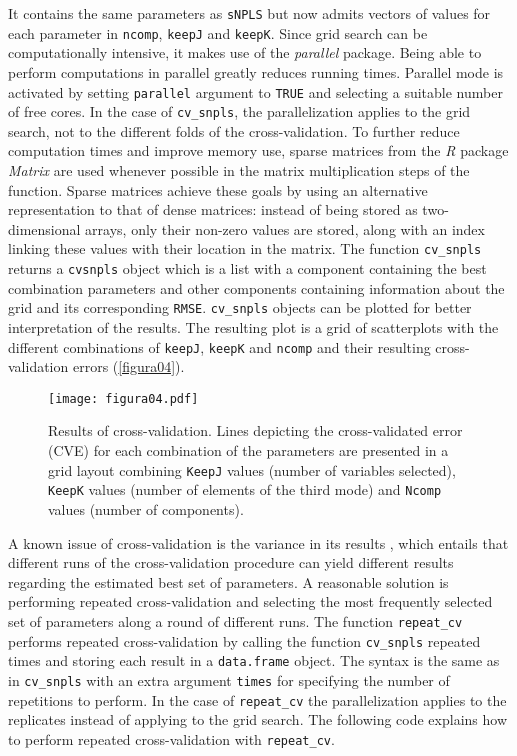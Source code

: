 It contains the same parameters as \texttt{sNPLS} but now admits vectors of values for each parameter in \texttt{ncomp}, \texttt{keepJ} and \texttt{keepK}. Since grid search can be computationally intensive, it makes use of the \textit{parallel} package. Being able to perform computations in parallel greatly reduces running times. Parallel mode is activated by setting \texttt{parallel} argument to \texttt{TRUE} and selecting a suitable number of free cores. In the case of \texttt{cv\_snpls}, the parallelization applies to the grid search, not to the different folds of the cross-validation. To further reduce computation times and improve memory use, sparse matrices from the \textit{R} package \textit{Matrix} \parencite{matrixsparse} are used whenever possible in the matrix multiplication steps of the function. Sparse matrices achieve these goals by using an alternative representation to that of dense matrices: instead of being stored as two-dimensional arrays, only their non-zero values are stored, along with an index linking these values with their location in the matrix. The function \texttt{cv\_snpls} returns a \texttt{cvsnpls} object which is a list with a component containing the best combination parameters and other components containing information about the grid and its corresponding \texttt{RMSE}. \texttt{cv\_snpls} objects  can be plotted for better interpretation of the results. The resulting plot is a grid of scatterplots with the different combinations of \texttt{keepJ}, \texttt{keepK} and \texttt{ncomp} and their resulting cross-validation errors (\autoref{figura04}).

\begin{figure}[!ht]
	\centering
\texttt{[image: figura04.pdf]}
\caption{Results of cross-validation. Lines depicting the cross-validated error (CVE) for each combination of the parameters are presented in a grid layout combining \texttt{KeepJ} values (number of variables selected), \texttt{KeepK} values (number of elements of the third mode) and \texttt{Ncomp} values (number of components).}
\label{figura04}
\end{figure}

A known issue of cross-validation is the variance in its results \parencite{krstajic2014cross}, which entails that different runs of the cross-validation procedure can yield different results regarding the estimated best set of parameters. A reasonable solution is performing repeated cross-validation and selecting the most frequently selected set of parameters along a round of different runs. The function \texttt{repeat\_cv} performs repeated cross-validation by calling the function \texttt{cv\_snpls} repeated times and storing each result in a \texttt{data.frame} object. The syntax is the same as in \texttt{cv\_snpls} with an extra argument \texttt{times} for specifying the number of repetitions to perform. In the case of \texttt{repeat\_cv} the parallelization applies to the replicates instead of applying to the grid search. The following code explains how to perform repeated cross-validation with \texttt{repeat\_cv}.

